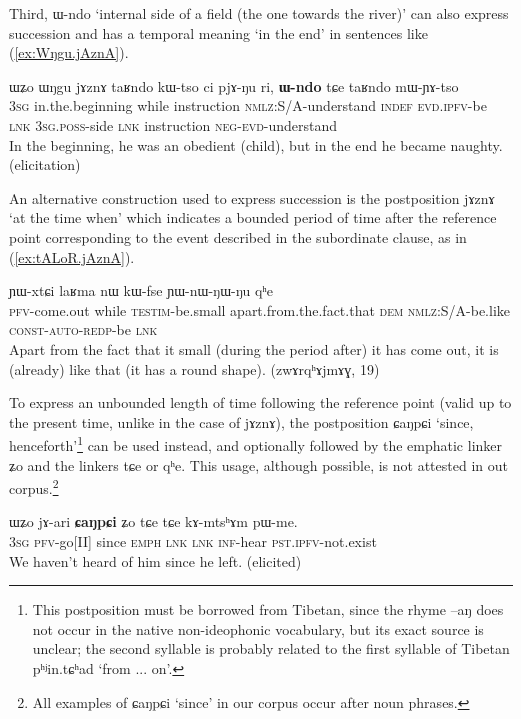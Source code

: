 \documentclass[oldfontcommands,oneside,a4paper,11pt]{article}
\newcommand{\ipa}[1]{{\phon \mbox{#1}}} %
\newcommand{\refb}[1]{(\ref{#1})}
\begin{document}
Third,  \ipa{ɯ-ndo} `internal side of a field (the one towards the river)' can also express  succession and has a temporal meaning `in the end' in sentences like \refb{ex:Wŋgu.jAznA}.

\begin{exe}
\ex \label{ex:Wŋgu.jAznA}
\gll 
\ipa{ɯʑo}  	\ipa{ɯŋgu}  	\ipa{jɤznɤ}  	\ipa{taʁndo}  	\ipa{kɯ-tso}  	\ipa{ci}  	\ipa{pjɤ-ŋu}  	\ipa{ri,}  	\ipa{\textbf{ɯ-ndo}}  	\ipa{tɕe}  	\ipa{taʁndo}  	\ipa{mɯ-ɲɤ-tso}  	\\
\textsc{3sg} in.the.beginning while instruction \textsc{nmlz}:S/A-understand \textsc{indef} \textsc{evd.ipfv}-be \textsc{lnk} \textsc{3sg.poss}-side \textsc{lnk} instruction \textsc{neg-evd}-understand \\
\glt In the beginning, he was an obedient (child), but in the end he became naughty. (elicitation)
\end{exe}

An alternative construction used to express succession is the postposition \ipa{jɤznɤ} `at the time when' which indicates a bounded period of time after the reference point corresponding to the event described in the subordinate clause, as in \refb{ex:tALoR.jAznA}.

\begin{exe}
\ex \label{ex:tALoR.jAznA}
\gll 
[\ipa{tɤ-ɬoʁ}]  	\ipa{\textbf{jɤznɤ}}  	\ipa{ɲɯ-xtɕi}  	\ipa{laʁma}  	\ipa{nɯ}  	\ipa{kɯ-fse}  	\ipa{ɲɯ-nɯ-ŋɯ-ŋu}  	\ipa{qʰe}  \\
\textsc{pfv}-come.out  while \textsc{testim}-be.small apart.from.the.fact.that \textsc{dem} \textsc{nmlz}:S/A-be.like \textsc{const-auto-redp}-be \textsc{lnk} \\
\glt Apart from the fact that it small (during the period after) it has come out, it is (already) like that (it has a round shape). (zwɤrqʰɤjmɤɣ, 19)
	\end{exe}


 To express an unbounded length of time following the reference point (valid up to the present time, unlike in the case of \ipa{jɤznɤ}), the postposition \ipa{ɕaŋpɕi} `since, henceforth'\footnote{This postposition must be borrowed from Tibetan, since the rhyme \ipa{--aŋ} does not occur in the native non-ideophonic vocabulary, but its exact source is unclear; the second syllable is probably related to the first syllable of Tibetan \ipa{pʰʲin.tɕʰad} `from ... on'.} can be used instead, and optionally followed by the emphatic linker \ipa{ʑo} and the linkers \ipa{tɕe} or \ipa{qʰe}. This usage, although possible, is not attested in out corpus.\footnote{All examples of \ipa{ɕaŋpɕi} `since' in our corpus occur after noun phrases.}
  \begin{exe}
\ex \label{ex:jariCaNpCi} 
\gll
 \ipa{ɯʑo}   	\ipa{jɤ-ari}   	\textbf{\ipa{ɕaŋpɕi}}   	\ipa{ʑo}   	\ipa{tɕe}   	\ipa{tɕe}   	\ipa{kɤ-mtsʰɤm}   	\ipa{pɯ-me.}   	\\
\textsc{3sg} \textsc{pfv}-go[II] since \textsc{emph} \textsc{lnk}  \textsc{lnk} \textsc{inf}-hear \textsc{pst.ipfv}-not.exist \\
 \glt We haven't heard of him since he left. (elicited)
\end{exe}
 
\end{document}
